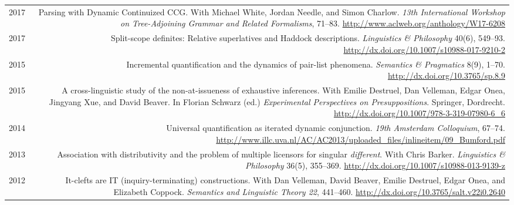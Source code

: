 \documentclass[12pt]{article}
\newcommand{\doi}[1]{\url{http://dx.doi.org/#1}}
\newcommand{\refmark}{\textcolor{gray}{}}
\newcommand{\flag}{\llap{\refmark~~}}
\begin{document}
\begin{longtable}{LR}
  2017  & Parsing with Dynamic Continuized CCG.\newline
          With Michael White, Jordan Needle, and Simon Charlow.\newline
          \textit{13th International Workshop on Tree-Adjoining Grammar and
          Related Formalisms}, 71--83.\newline
          \url{http://www.aclweb.org/anthology/W17-6208}\\
  \flag%
  2017  & Split-scope definites: Relative superlatives and Haddock
          descriptions.\newline
          \textit{Linguistics \& Philosophy} 40(6), 549--93.\newline
          \doi{10.1007/s10988-017-9210-2}\\
  \flag%
  2015  & Incremental quantification and the dynamics of pair-list phenomena.\newline
          \textit{Semantics \& Pragmatics} 8(9), 1--70.\newline
          \doi{10.3765/sp.8.9}\\
  2015  & A cross-linguistic study of the non-at-issueness of exhaustive
          inferences.\newline
          With Emilie Destruel, Dan Velleman, Edgar Onea, Jingyang Xue, and
          David Beaver.\newline
          In Florian Schwarz (ed.) \textit{Experimental Perspectives on
          Presuppositions}. Springer, Dordrecht.\newline
          \doi{10.1007/978-3-319-07980-6_6}\\ %
  2014  & Universal quantification as iterated dynamic conjunction.\newline
          \textit{19th Amsterdam Colloquium}, 67--74.\newline
          \url{http://www.illc.uva.nl/AC/AC2013/uploaded_files/inlineitem/09_Bumford.pdf}\\
  \flag%
  2013  & Association with distributivity and the problem of multiple
          licensors for singular \textit{different}.\newline
          With Chris Barker.\newline
          \textit{Linguistics \& Philosophy} 36(5), 355--369.\newline
          \doi{10.1007/s10988-013-9139-z}\\ %
  2012  & It-clefts are IT (inquiry-terminating) constructions.\newline
          With Dan Velleman, David Beaver, Emilie Destruel, Edgar Onea, and
          Elizabeth Coppock.\newline
          \textit{Semantics and Linguistic Theory 22}, 441--460.\newline
          \doi{10.3765/salt.v22i0.2640}
\end{longtable}
\endgroup
\end{document}

